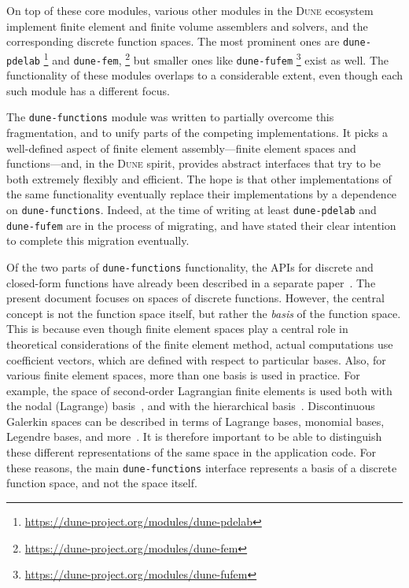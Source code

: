 \documentclass[a4paper,10pt,headings=normal,bibliography=totoc]{scrartcl}
\newcommand{\dune}{\textsc{Dune}\xspace}
\newcommand{\dunemodule}[1]{\texttt{#1}}
\begin{document}
On top of these core modules, various other modules in the \dune ecosystem implement finite element and finite volume assemblers
and solvers, and the corresponding discrete function spaces. The most prominent ones are
\dunemodule{dune-pdelab}%
\footnote{\url{https://dune-project.org/modules/dune-pdelab}}
%
and \dunemodule{dune-fem},%
\footnote{\url{https://dune-project.org/modules/dune-fem}}
%
but smaller ones like \dunemodule{dune-fufem}%
\footnote{\url{https://dune-project.org/modules/dune-fufem}}
%
exist as well.  The functionality of these modules overlaps to a considerable extent, even though
each such module has a different focus.

The \dunemodule{dune-functions}  module was written to partially overcome this fragmentation,
and to unify parts of the competing implementations.
It picks a well-defined aspect of finite element assembly---finite element spaces and functions---and,
in the \dune spirit, provides abstract interfaces that try to be both extremely flexibly
and efficient.  The hope is that other implementations of the same functionality
eventually replace their implementations by a dependence on \dunemodule{dune-functions}.
Indeed, at the time of writing at least \dunemodule{dune-pdelab} and \dunemodule{dune-fufem} are in the process
of migrating, and have stated their clear intention to complete this migration eventually.

Of the two parts of \dunemodule{dune-functions} functionality, the APIs for discrete and
closed-form functions have already been described in a separate paper~\cite{engwer_graeser_muething_sander:2015}.
The present document focuses on spaces of discrete functions.  However,
the central concept is not the function space itself, but rather the {\em basis} of the function space.
This is because even though finite element spaces play a central role in theoretical considerations of
the finite element method,
actual computations use coefficient vectors, which are defined with respect to particular bases.  Also,
for various finite element spaces, more than one basis is used in practice.  For example,
the space of second-order Lagrangian finite elements is used both with the nodal (Lagrange) basis~\cite{braess:2013},
and with the
hierarchical basis~\cite{bank:1996}.  Discontinuous Galerkin spaces can be described in terms of Lagrange bases,
monomial bases, Legendre bases, and more~\cite{hesthaven_warburton:2008}.
It is therefore important to be able to distinguish these different
representations of the same space in the application code.
For these reasons, the main \dunemodule{dune-functions} interface represents a basis of a
discrete function space, and not the space itself.
\end{document}
